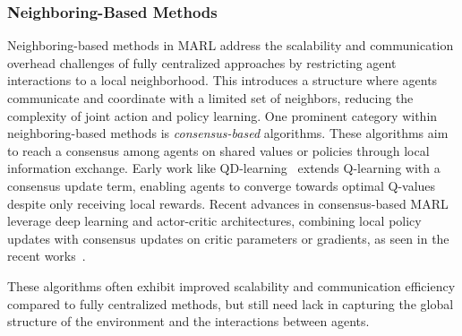 \documentclass[sigconf]{acmart}
\begin{document}
\subsubsection{Neighboring-Based Methods}
Neighboring-based methods in MARL address the scalability and communication overhead challenges of fully centralized approaches by restricting agent interactions to a local neighborhood. 
This introduces a structure where agents communicate and coordinate with a limited set of neighbors, reducing the complexity of joint action and policy learning.
%
One prominent category within neighboring-based methods is \emph{consensus-based} algorithms. 
These algorithms aim to reach a consensus among agents on shared values or policies through local information exchange. 
Early work like QD-learning~\cite{kar2012qd} extends Q-learning with a consensus update term, 
enabling agents to converge towards optimal Q-values despite only receiving local rewards.
%  
Recent advances in consensus-based MARL leverage deep learning and actor-critic architectures, 
combining local policy updates with consensus updates on critic parameters or gradients, 
as seen in the recent works~\cite{7434032,pennesi2010distributed,zhang2018fully,DBLP:journals/jmlr/CiosekW20}.

These algorithms often exhibit improved scalability and communication efficiency compared to fully centralized methods, 
but still need lack in capturing the global structure of the environment and the interactions between agents.
\end{document}
